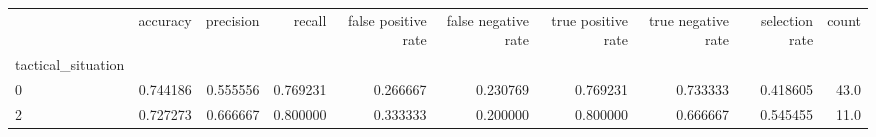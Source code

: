 \begin{tabular}{lrrrrrrrrr}
\toprule
{} &  accuracy &  precision &    recall &  false positive rate &  false negative rate &  true positive rate &  true negative rate &  selection rate &  count \\
tactical\_situation &           &            &           &                      &                      &                     &                     &                 &        \\
\midrule
0                  &  0.744186 &   0.555556 &  0.769231 &             0.266667 &             0.230769 &            0.769231 &            0.733333 &        0.418605 &   43.0 \\
2                  &  0.727273 &   0.666667 &  0.800000 &             0.333333 &             0.200000 &            0.800000 &            0.666667 &        0.545455 &   11.0 \\
\bottomrule
\end{tabular}

